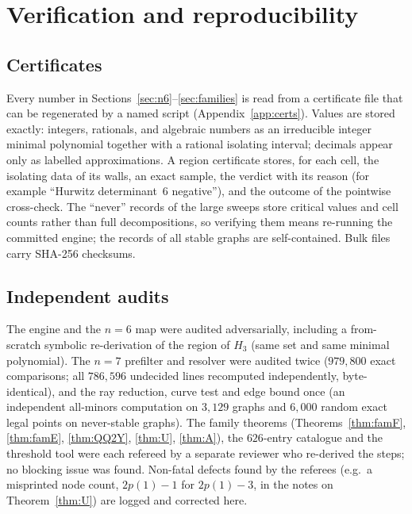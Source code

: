 \documentclass[11pt]{article}
\theoremstyle{definition}
\begin{document}
\section{Verification and reproducibility}\label{sec:verification}

\subsection{Certificates}
Every number in Sections~\ref{sec:n6}--\ref{sec:families} is read from a certificate file that can be regenerated by a named
script (Appendix~\ref{app:certs}). Values are stored exactly: integers, rationals, and algebraic numbers as an irreducible
integer minimal polynomial together with a rational isolating interval; decimals appear only as labelled approximations. A
region certificate stores, for each cell, the isolating data of its walls, an exact sample, the verdict with its reason (for
example ``Hurwitz determinant~6 negative''), and the outcome of the pointwise cross-check. The ``never'' records of the large
sweeps store critical values and cell counts rather than full decompositions, so verifying them means re-running the committed
engine; the records of all stable graphs are self-contained. Bulk files carry SHA-256 checksums.

\subsection{Independent audits}
The engine and the $n=6$ map were audited adversarially, including a from-scratch symbolic re-derivation of the region of $H_3$
(same set and same minimal polynomial). The $n=7$ prefilter and resolver were audited twice ($979{,}800$ exact comparisons; all
$786{,}596$ undecided lines recomputed independently, byte-identical), and the ray reduction, curve test and edge bound once (an
independent all-minors computation on $3{,}129$ graphs and $6{,}000$ random exact legal points on never-stable graphs). The family
theorems (Theorems~\ref{thm:famF}, \ref{thm:famE}, \ref{thm:QQ2Y}, \ref{thm:U}, \ref{thm:A}), the $626$-entry catalogue and the
threshold tool were each refereed by a separate reviewer who re-derived the steps; no blocking issue was found. Non-fatal defects found
by the referees (e.g.\ a misprinted node count, $2p(1)-1$ for $2p(1)-3$, in the notes on Theorem~\ref{thm:U}) are logged and
corrected here.
\end{document}
